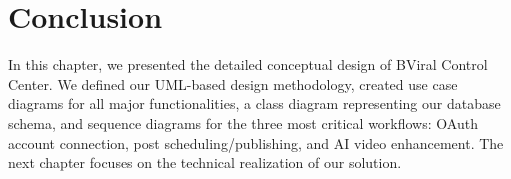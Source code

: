 \section*{Conclusion}
In this chapter, we presented the detailed conceptual design of BViral Control Center. We defined our UML-based design methodology, created use case diagrams for all major functionalities, a class diagram representing our database schema, and sequence diagrams for the three most critical workflows: OAuth account connection, post scheduling/publishing, and AI video enhancement. The next chapter focuses on the technical realization of our solution.
